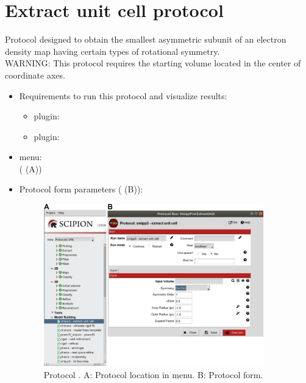 \section{Extract unit cell protocol}
\label{app:extractUnitCell}%
Protocol designed to obtain the smallest asymmetric subunit of an electron density map having certain types of rotational symmetry.\\
WARNING: This protocol requires the starting volume located in the center of coordinate axes.\\

\begin{itemize}
  \item Requirements to run this protocol and visualize results:
    \begin{itemize}
        \item \scipion plugin: 
        \item \scipion plugin: 
    \end{itemize}
  \item \scipion menu:\\
   ( (A))\\
  
  \item Protocol form parameters ( (B)):\\
  
  \begin{figure}[H]
    \centering 
    \captionsetup{width=.7\linewidth} 
    \includegraphics[width=0.90\textwidth]{Images_appendix/Fig107.pdf}
    \caption{Protocol . A: Protocol location in \scipion menu. B: Protocol form.}
    \label{fig:app_protocol_extractUnitCell_1}
   \end{figure}
  

\end{itemize}
